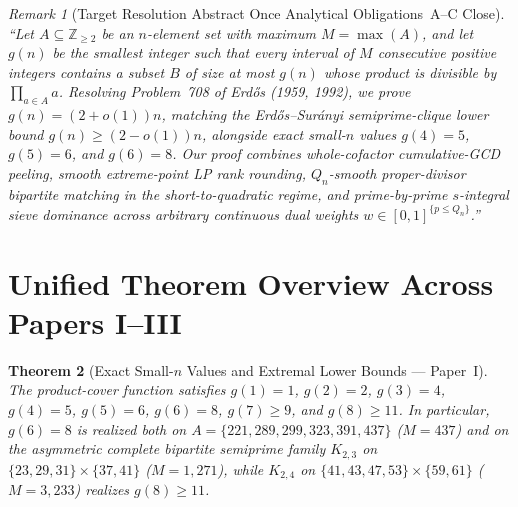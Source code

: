 \documentclass[11pt]{article}
\newtheorem{theorem}{Theorem}
\theoremstyle{remark}
\newtheorem{remark}[theorem]{Remark}
\begin{document}
\begin{abstract}
\begin{enumerate}
\end{enumerate}
\end{abstract}

\begin{remark}[Target Resolution Abstract Once Analytical Obligations~A--C Close]
\emph{``Let $A \subseteq \mathbb{Z}_{\ge 2}$ be an $n$-element set with maximum $M = \max(A)$, and let $g(n)$ be the smallest integer such that every interval of $M$ consecutive positive integers contains a subset $B$ of size at most $g(n)$ whose product is divisible by $\prod_{a \in A} a$. Resolving Problem~708 of Erd\H{o}s (1959, 1992), we prove $g(n) = (2 + o(1))n$, matching the Erd\H{o}s--Sur\'anyi semiprime-clique lower bound $g(n) \ge (2 - o(1))n$, alongside exact small-$n$ values $g(4) = 5$, $g(5) = 6$, and $g(6) = 8$. Our proof combines whole-cofactor cumulative-GCD peeling, smooth extreme-point LP rank rounding, $Q_n$-smooth proper-divisor bipartite matching in the short-to-quadratic regime, and prime-by-prime $s$-integral sieve dominance across arbitrary continuous dual weights $w \in [0, 1]^{\{p \le Q_n\}}$.''}
\end{remark}

\section{Unified Theorem Overview Across Papers I--III}

\begin{theorem}[Exact Small-$n$ Values and Extremal Lower Bounds --- Paper~I]
The product-cover function satisfies $g(1) = 1$, $g(2) = 2$, $g(3) = 4$, $g(4) = 5$, $g(5) = 6$, $g(6) = 8$, $g(7) \ge 9$, and $g(8) \ge 11$. In particular, $g(6) = 8$ is realized both on $A = \{221, 289, 299, 323, 391, 437\}$ ($M = 437$) and on the asymmetric complete bipartite semiprime family $K_{2,3}$ on $\{23, 29, 31\} \times \{37, 41\}$ ($M = 1{,}271$), while $K_{2,4}$ on $\{41, 43, 47, 53\} \times \{59, 61\}$ ($M = 3{,}233$) realizes $g(8) \ge 11$.
\end{theorem}
\end{document}
